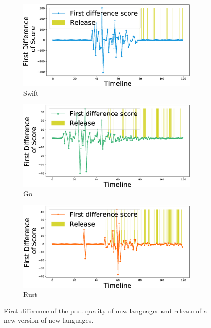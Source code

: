 \begin{figure}[htbp]
\begin{subfigure}{0.6\textwidth}
\centering
\includegraphics[scale=0.25]{figures/Swift_First_difference_release.eps}
\caption{Swift}
\label{fig:Go_FDR}
\end{subfigure}
\begin{subfigure}{0.6\textwidth}
\centering
\includegraphics[scale=0.25]{figures/Go_First_difference_release.eps}
\caption{Go}
\label{fig:Swift_FDR}
\end{subfigure}
\begin{subfigure}{0.6\textwidth}
\centering
\includegraphics[scale=0.25]{figures/Rust_First_difference_release.eps}
\caption{Rust}
\label{fig:Rust_FDR}
\end{subfigure}
\caption{First difference of the post quality of new languages and release of a new version of new languages.}
\label{First difference and release}
\end{figure}

